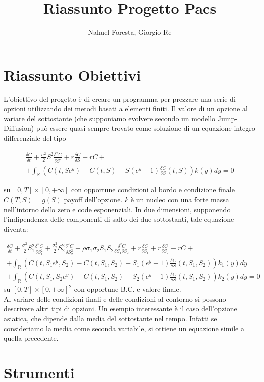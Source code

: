 \documentclass[a4paper,10pt]{article}
\title{Riassunto Progetto Pacs}
\author{Nahuel Foresta, Giorgio Re}
\newcommand{\der}[2]{\frac{\delta #1}{\delta #2}}
\newcommand{\dder}[2]{\frac{\delta^2 #1}{\delta #2^2}}
\newcommand{\dmix}[3]{\frac{\delta^2 #1}{\delta #2 \delta #3}}
\begin{document}
\maketitle

\section{Riassunto Obiettivi}

L'obiettivo del progetto è di creare un programma per prezzare una serie di opzioni utilizzando dei metodi basati a elementi finiti. Il valore di un opzione al variare del sottostante (che supponiamo evolvere secondo un modello Jump-Diffusion) può essere quasi sempre trovato come soluzione di un equazione integro differenziale del tipo

\begin{multline}
 \der{C}{t}+\frac{\sigma^2}{2}S^2\dder{C}{S}+r\der{C}{S}-rC+\\+ \int_\mathbb{R}\left(C(t,Se^y)-C(t,S)-S(e^y-1)\der{C}{S}(t,S)\right)k(y)dy=0
\end{multline}

su $[0,T]\times[0,+\infty]$ con opportune condizioni al bordo e condizione finale $C(T,S)=g(S)$ payoff dell'opzione. $k$ è un nucleo con una forte massa nell'intorno dello zero e code esponenziali.
In due dimensioni, supponendo l'indipendenza delle componenti di salto dei due sottostanti, tale equazione diventa:


\begin{multline}
 \der{C}{t}+\frac{\sigma_1^2}{2}S_1^2\dder{C}{S_1}+\frac{\sigma_2^2}{2}S_2^2\dder{C}{S_2}+\rho\sigma_1\sigma_2 S_1 S_2 \dmix{C}{S_1}{S_2}+
 r\der{C}{S_1}+r\der{C}{S_2}-rC+ \\
 + \int_\mathbb{R}\left(C(t,S_1e^{y},S_2)-C(t,S_1,S_2)-S_1(e^y-1)\der{C}{S}(t,S_1,S_2)\right)k_1(y)dy\\
 + \int_\mathbb{R}\left(C(t,S_1,S_2e^{y})-C(t,S_1,S_2)-S_2(e^y-1)\der{C}{S}(t,S_1,S_2)\right)k_2(y)dy=0 
\end{multline}
su $[0,T]\times[0,+\infty]^2$ con opportune B.C. e valore finale.
\\
Al variare delle condizioni finali e delle condizioni al contorno si possono descrivere altri tipi di opzioni. Un esempio interessante è il caso dell'opzione asiatica, che dipende dalla media del sottostante nel tempo. Infatti se consideriamo la media come seconda variabile, si ottiene un equazione simile a quella precedente.

\section{Strumenti}
\end{document}
